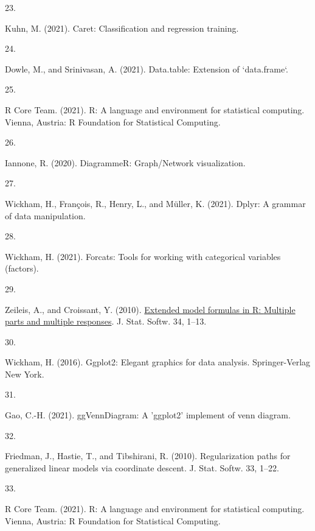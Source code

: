 \documentclass[
]{article}
\newlength{\cslhangindent}
\newlength{\csllabelwidth}
\newlength{\cslentryspacingunit} %
\newenvironment{CSLReferences}[2] %
 {%
  \setlength{\parindent}{0pt}
  \ifodd #1
  \let\oldpar\par
  \def\par{\hangindent=\cslhangindent\oldpar}
  \fi
  \setlength{\parskip}{#2\cslentryspacingunit}
 }%
 {}
\newcommand{\CSLLeftMargin}[1]{\parbox[t]{\csllabelwidth}{#1}}
\newcommand{\CSLRightInline}[1]{\parbox[t]{\linewidth - \csllabelwidth}{#1}\break}
\begin{document}
\begin{CSLReferences}{0}{0}
\leavevmode{}%
\CSLLeftMargin{23. }
\CSLRightInline{Kuhn, M. (2021). Caret: {Classification} and regression training.}

\leavevmode{}%
\CSLLeftMargin{24. }
\CSLRightInline{Dowle, M., and Srinivasan, A. (2021). Data.table: {Extension} of `data.frame`.}

\leavevmode{}%
\CSLLeftMargin{25. }
\CSLRightInline{R Core Team. (2021). R: {A} language and environment for statistical computing. {Vienna, Austria}: {R Foundation for Statistical Computing}.}

\leavevmode{}%
\CSLLeftMargin{26. }
\CSLRightInline{Iannone, R. (2020). {DiagrammeR}: {Graph}/{Network} visualization.}

\leavevmode{}%
\CSLLeftMargin{27. }
\CSLRightInline{Wickham, H., François, R., Henry, L., and Müller, K. (2021). Dplyr: {A} grammar of data manipulation.}

\leavevmode{}%
\CSLLeftMargin{28. }
\CSLRightInline{Wickham, H. (2021). Forcats: {Tools} for working with categorical variables (factors).}

\leavevmode{}%
\CSLLeftMargin{29. }
\CSLRightInline{Zeileis, A., and Croissant, Y. (2010). \href{https://doi.org/10.18637/jss.v034.i01}{Extended model formulas in {R}: {Multiple} parts and multiple responses}. J. Stat. Softw. 34, 1--13.}

\leavevmode{}%
\CSLLeftMargin{30. }
\CSLRightInline{Wickham, H. (2016). Ggplot2: {Elegant} graphics for data analysis. {Springer-Verlag New York}.}

\leavevmode{}%
\CSLLeftMargin{31. }
\CSLRightInline{Gao, C.-H. (2021). {ggVennDiagram}: {A} 'ggplot2' implement of venn diagram.}

\leavevmode{}%
\CSLLeftMargin{32. }
\CSLRightInline{Friedman, J., Hastie, T., and Tibshirani, R. (2010). Regularization paths for generalized linear models via coordinate descent. J. Stat. Softw. 33, 1--22.}

\leavevmode{}%
\CSLLeftMargin{33. }
\CSLRightInline{R Core Team. (2021). R: {A} language and environment for statistical computing. {Vienna, Austria}: {R Foundation for Statistical Computing}.}


\end{CSLReferences}
\end{document}
